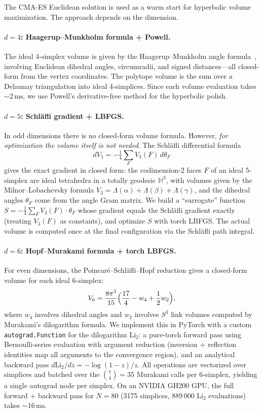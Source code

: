 \documentclass[11pt]{article}
\begin{document}
The CMA-ES Euclidean solution is used as a warm start for
hyperbolic volume maximization.  The approach depends on
the dimension.

\paragraph{$d = 4$: Haagerup--Munkholm formula + Powell.}
The ideal 4-simplex volume is given by the Haagerup--Munkholm
angle formula~\cite{HM}, involving Euclidean dihedral angles,
circumradii, and signed distances---all closed-form from the
vertex coordinates.  The polytope volume is the sum over a
Delaunay triangulation into ideal 4-simplices.  Since each volume
evaluation takes $\sim 2\,\text{ms}$, we use Powell's derivative-free
method for the hyperbolic polish.

\paragraph{$d = 5$: Schl\"afli gradient + LBFGS.}
In odd dimensions there is no closed-form volume formula.
However, \emph{for optimization the volume itself is not needed}.
The Schl\"afli differential formula
\[
  dV_5 = -\tfrac{1}{4}\sum_{F} V_3(F)\,d\theta_F
\]
gives the exact gradient in closed form: the codimension-2 faces
$F$ of an ideal 5-simplex are ideal tetrahedra in a totally
geodesic $\mathbb{H}^3$, with volumes given by the
Milnor--Lobachevsky formula $V_3 = \Lambda(\alpha) + \Lambda(\beta)
+ \Lambda(\gamma)$, and the dihedral angles $\theta_F$ come from
the angle Gram matrix.  We build a ``surrogate'' function
$S = -\frac{1}{4}\sum_F V_3(F) \cdot \theta_F$ whose gradient
equals the Schl\"afli gradient exactly (treating $V_3(F)$ as
constants), and optimize $S$ with torch LBFGS.  The actual
volume is computed once at the final configuration via the
Schl\"afli path integral.

\paragraph{$d = 6$: Hopf--Murakami formula + torch LBFGS.}
For even dimensions, the Poincar\'e--Schl\"afli--Hopf reduction
gives a closed-form volume for each ideal 6-simplex:
\[
  V_6 = \frac{8\pi^3}{15}\Bigl(\frac{17}{4} - w_4 + \frac{1}{2}w_2\Bigr),
\]
where $w_4$ involves dihedral angles and $w_2$ involves $S^3$
link volumes computed by Murakami's dilogarithm formula.  We
implement this in PyTorch with a custom \texttt{autograd.Function}
for the dilogarithm $\mathrm{Li}_2$: a pure-torch forward pass
using Bernoulli-series evaluation with argument reduction
(inversion + reflection identities map all arguments to the
convergence region), and an analytical backward pass
$d\mathrm{Li}_2/dz = -\log(1-z)/z$.  All operations are
vectorized over simplices and batched over the $\binom{7}{4} = 35$
Murakami calls per 6-simplex, yielding a single autograd node per
simplex.  On an NVIDIA GH200 GPU, the full forward + backward
pass for $N = 80$ (3175 simplices, 889\,000 $\mathrm{Li}_2$
evaluations) takes $\sim 16\,\text{ms}$.
\end{document}
